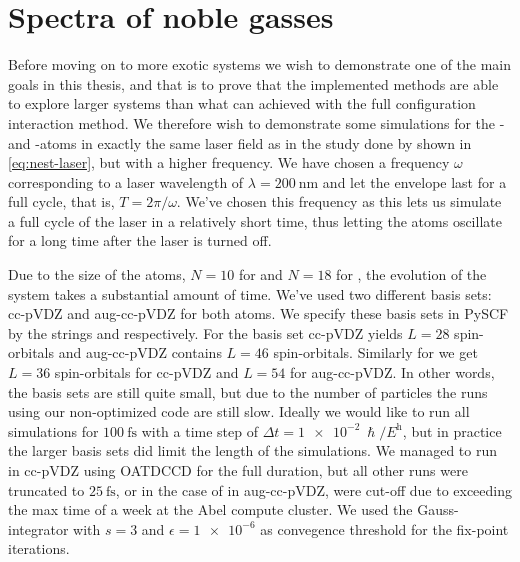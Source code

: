     \section{Spectra of noble gasses}
        \label{sec:noble-gasses}
        Before moving on to more exotic systems we wish to demonstrate one of
        the main goals in this thesis, and that is to prove that the implemented
        methods are able to explore larger systems than what can achieved with
        the full configuration interaction method.
        We therefore wish to demonstrate some simulations for the - and
        -atoms in exactly the same laser field as in the study done by
        \citeauthor{nest} \cite{nest} shown in \autoref{eq:nest-laser}, but with
        a higher frequency.
        We have chosen a frequency $\omega$ corresponding to a laser wavelength
        of $\lambda = \SI{200}{\nm}$ and let the envelope last for a full cycle,
        that is, $T = 2\pi / \omega$.
        We've chosen this frequency as this lets us simulate a full cycle of the
        laser in a relatively short time, thus letting the atoms oscillate for a
        long time after the laser is turned off.

        Due to the size of the atoms, $N = 10$ for  and $N = 18$ for
        , the evolution of the system takes a substantial amount of time.
        We've used two different basis sets: cc-pVDZ and aug-cc-pVDZ for both
        atoms.
        We specify these basis sets in PySCF \cite{pyscf} by the strings
         and  respectively.
        For  the basis set cc-pVDZ yields $L = 28$ spin-orbitals and
        aug-cc-pVDZ contains $L = 46$ spin-orbitals.
        Similarly for  we get $L = 36$ spin-orbitals for cc-pVDZ and $L =
        54$ for aug-cc-pVDZ.
        In other words, the basis sets are still quite small, but due to the
        number of particles the runs using our non-optimized code are still
        slow.
        Ideally we would like to run all simulations for $\SI{100}{\fs}$ with a
        time step of $\Delta t = \SI{1e-2}{\hslash/\hartree}$, but in
        practice the larger basis sets did limit the length of the simulations.
        We managed to run  in cc-pVDZ using OATDCCD for the full
        duration, but all other runs were truncated to $\SI{25}{\fs}$, or in the
        case of  in aug-cc-pVDZ, were cut-off due to exceeding the max
        time of a week at the Abel compute cluster.
        We used the Gauss-integrator with $s = 3$ and $\epsilon = \num{1e-6}$ as
        convegence threshold for the fix-point iterations.

